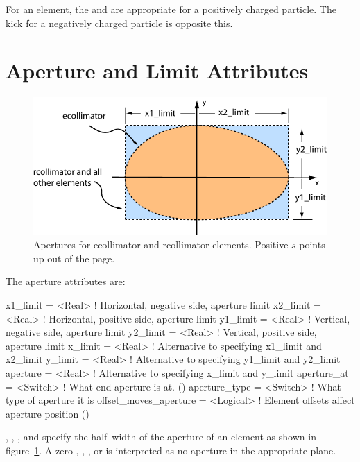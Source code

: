 For an  element, the  and  are
appropriate for a positively charged particle. The kick for a
negatively charged particle is opposite this.

\section{Aperture and Limit Attributes}
\label{s:limit}

\begin{figure}[ht]
  \centering
  \includegraphics{apertures.pdf}
  \caption[Apertures for ecollimator and rcollimator elements.]
  {Apertures for ecollimator and rcollimator elements. 
  Positive $s$ points up out of the page.}
  \label{f:limit}
\end{figure}

The aperture attributes are:
\begin{example}
  x1_limit      = <Real>      ! Horizontal, negative side, aperture limit
  x2_limit      = <Real>      ! Horizontal, positive side, aperture limit
  y1_limit      = <Real>      ! Vertical, negative side, aperture limit
  y2_limit      = <Real>      ! Vertical, positive side, aperture limit
  x_limit       = <Real>      ! Alternative to specifying x1_limit and x2_limit
  y_limit       = <Real>      ! Alternative to specifying y1_limit and y2_limit
  aperture      = <Real>      ! Alternative to specifying x_limit and y_limit
  aperture_at   = <Switch>    ! What end aperture is at. ()
  aperture_type = <Switch>    ! What type of aperture it is
  offset_moves_aperture = <Logical> ! Element offsets affect aperture position ()
\end{example}
, , , and  specify
the half--width of the aperture of an element as shown in
figure~\ref{f:limit}. A zero , ,
, or  is interpreted as no aperture in the
appropriate plane.

